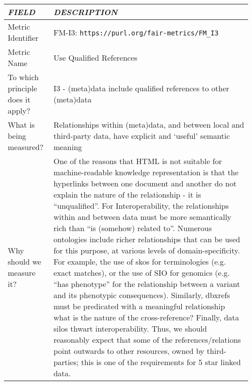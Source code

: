 \documentclass[english]{article}
\begin{document}
\begin{longtable}{|p{5cm}|p{9cm}|}


\hline
\emph{FIELD} & \emph{DESCRIPTION} \\
\hline
Metric Identifier &   FM-I3: \verb"https://purl.org/fair-metrics/FM_I3"
\\


\hline
Metric Name &   



Use Qualified References


 \\



\hline
To which principle does it apply? &   


I3 - (meta)data include qualified references to other (meta)data

\\



\hline
What is being measured? & 


Relationships within (meta)data, and between local and third-party data, have explicit and ‘useful’ semantic meaning


\\



\hline
Why should we measure it? & 


One of the reasons that HTML is not suitable for machine-readable knowledge representation is that the hyperlinks between one document and another do not explain the nature of the relationship - it is “unqualified”.  For Interoperability, the relationships within and between data must be more semantically rich than “is (somehow) related to”.\newline 
\newline 
Numerous ontologies include richer relationships that can be used for this purpose, at various levels of domain-specificity.  For example, the use of skos for terminologies (e.g. exact matches), or the use of SIO for genomics (e.g. “has phenotype” for the relationship between a variant and its phenotypic consequences).\newline 
\newline 
Similarly, dbxrefs must be predicated with a meaningful relationship  what is the nature of the cross-reference?\newline 
\newline 
Finally, data silos thwart interoperability.  Thus, we should reasonably expect that some of the references/relations point outwards to other resources, owned by third-parties; this is one of the requirements for 5 star linked data. \newline 


\end{longtable}
\end{document}
